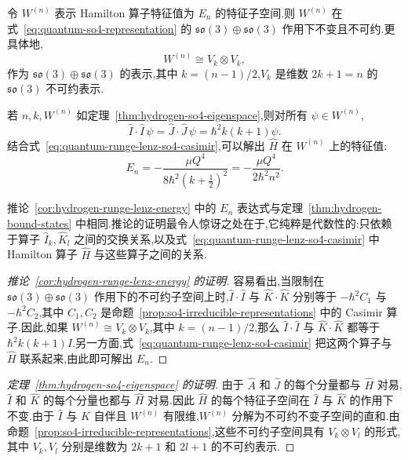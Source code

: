 {\begin{theorem}\label{thm:hydrogen-so4-eigenspace}
令 $W^{(n)}$ 表示 Hamilton 算子特征值为 $E_n$ 的特征子空间.则 $W^{(n)}$ 在式~\eqref{eq:quantum-so4-representation} 的 $\mathfrak{so}(3)\oplus\mathfrak{so}(3)$ 作用下不变且不可约.更具体地,
\[
 W^{(n)}\cong V_k\otimes V_k,
\]
作为 $\mathfrak{so}(3)\oplus\mathfrak{so}(3)$ 的表示,其中 $k=(n-1)/2$,$V_k$ 是维数 $2k+1=n$ 的 $\mathfrak{so}(3)$ 不可约表示.
\end{theorem}

\begin{corollary}\label{cor:hydrogen-runge-lenz-energy}
若 $n,k,W^{(n)}$ 如定理~\ref{thm:hydrogen-so4-eigenspace},则对所有 $\psi\in W^{(n)}$,
\[
 \widehat I\cdot\widehat I\,\psi
 =\widehat J\cdot\widehat J\,\psi
 =\hbar^2k(k+1)\psi.
\]
结合式~\eqref{eq:quantum-runge-lenz-so4-casimir},可以解出 $\widehat H$ 在 $W^{(n)}$ 上的特征值:
\[
 E_n=-\frac{\mu Q^4}{8\hbar^2\left(k+\frac12\right)^2}
 =-\frac{\mu Q^4}{2\hbar^2n^2}.
\]
\end{corollary}

推论~\ref{cor:hydrogen-runge-lenz-energy} 中的 $E_n$ 表达式与定理~\ref{thm:hydrogen-bound-states} 中相同.推论的证明最令人惊讶之处在于,它纯粹是代数性的:只依赖于算子 $\widehat I_k,\widehat K_l$ 之间的交换关系,以及式~\eqref{eq:quantum-runge-lenz-so4-casimir} 中 Hamilton 算子 $\widehat H$ 与这些算子之间的关系.

\begin{proof}[推论~\ref{cor:hydrogen-runge-lenz-energy} 的证明]
容易看出,当限制在 $\mathfrak{so}(3)\oplus\mathfrak{so}(3)$ 作用下的不可约子空间上时,$\widehat I\cdot\widehat I$ 与 $\widehat K\cdot\widehat K$ 分别等于 $-\hbar^2C_1$ 与 $-\hbar^2C_2$,其中 $C_1,C_2$ 是命题~\ref{prop:so4-irreducible-representations} 中的 Casimir 算子.因此,如果 $W^{(n)}\cong V_k\otimes V_k$,其中 $k=(n-1)/2$,那么 $\widehat I\cdot\widehat I$ 与 $\widehat K\cdot\widehat K$ 都等于 $\hbar^2k(k+1)I$.另一方面,式~\eqref{eq:quantum-runge-lenz-so4-casimir} 把这两个算子与 $\widehat H$ 联系起来,由此即可解出 $E_n$.
\end{proof}

\begin{proof}[定理~\ref{thm:hydrogen-so4-eigenspace} 的证明]
由于 $\widehat A$ 和 $\widehat J$ 的每个分量都与 $\widehat H$ 对易,$\widehat I$ 和 $\widehat K$ 的每个分量也都与 $\widehat H$ 对易.因此 $\widehat H$ 的每个特征子空间在 $\widehat I$ 与 $\widehat K$ 的作用下不变.由于 $\widehat I$ 与 $\widehat K$ 自伴且 $W^{(n)}$ 有限维,$W^{(n)}$ 分解为不可约不变子空间的直和.由命题~\ref{prop:so4-irreducible-representations},这些不可约子空间具有 $V_k\otimes V_l$ 的形式,其中 $V_k,V_l$ 分别是维数为 $2k+1$ 和 $2l+1$ 的不可约表示.


\end{proof}}
